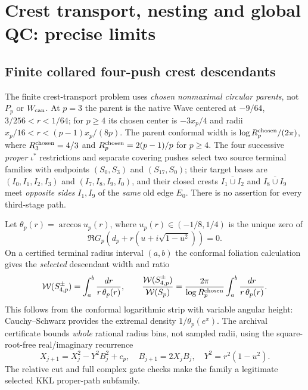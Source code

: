 \section{Crest transport, nesting and global QC: precise limits}
\label{sec:limits}
\subsection{Finite collared four-push crest descendants}
The finite crest-transport problem uses
\emph{chosen nonmaximal circular parents},
not $P_p$ or $W_{\rm can}$.
At $p=3$ the parent is the native
Wave centered at $-9/64$,
$3/256<r<1/64$; for $p\ge4$
its chosen center is $-3x_p/4$
and radii $x_p/16<r<(p-1)x_p/(8p)$.
The parent conformal width is
$\log R_p^{\rm chosen}/(2\pi)$,
where $R_3^{\rm chosen}=4/3$
and $R_p^{\rm chosen}=2(p-1)/p$
for $p\ge4$.  The four
successive \emph{proper}
$\iota^*$ restrictions and
separate covering pushes
select two source terminal
families with endpoints
$(S_0,S_3)$ and
$(S_{17},S_0)$; their
target bases are
$(I_0,I_1,I_2,I_3)$
and $(I_7,I_8,I_9,I_0)$,
and their closed crests
$\overline{I_1\cup I_2}$
and $\overline{I_8\cup I_9}$
meet \emph{opposite sides}
$I_1,I_9$ of the \emph{same}
old edge $E_0$.
There is no assertion for
every third-stage path.

Let $\theta_p(r)=\arccos u_p(r)$,
where $u_p(r)\in(-1/8,1/4)$ is
the unique zero of
\[
 \Re G_p\!\left(d_p+r
 (u+i\sqrt{1-u^2})\right)=0.
\]
On a certified terminal
radius interval $(a,b)$
the conformal foliation
calculation gives the
\emph{selected} descendant
width and ratio
\begin{equation}\label{eq:crest}
 \mathcal W(S^\pm_{4,p})=
 \int_a^b\frac{dr}{r\,\theta_p(r)},
 \qquad
 \frac{\mathcal W(S^\pm_{4,p})}{\mathcal W(S_p)}
 =\frac{2\pi}{\log R_p^{\rm chosen}}
       \int_a^b\frac{dr}{r\,\theta_p(r)}.
\end{equation}
This follows from the
conformal logarithmic
strip with variable
angular height:
Cauchy--Schwarz
provides the extremal
density $1/\theta_p(e^x)$.
The archival certificate
bounds \emph{whole}
rational radius bins,
not sampled radii, using
the square-root-free
real/imaginary recurrence
\[
 X_{j+1}=X_j^2-Y^2B_j^2+c_p,\quad
 B_{j+1}=2X_jB_j,\quad
 Y^2=r^2(1-u^2).
\]
The relative cut and
full complex gate checks
make the family a
legitimate selected
KKL proper-path
subfamily.

